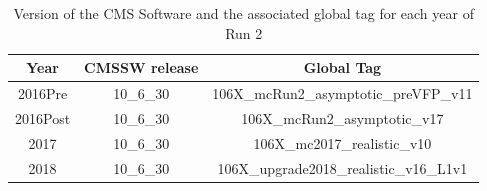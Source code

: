 \documentclass{cernatlasnote}
\begin{document}
\begin{table}
    \centering
    \begin{tabular}{| c | c | c |}
    \hline
    \rowcolor{lightgray} 
         Year &  CMSSW release & Global Tag  \\
    \hline
         2016Pre & 10\_6\_30 &   106X\_mcRun2\_asymptotic\_preVFP\_v11\\
    \hline
         2016Post & 10\_6\_30 &  106X\_mcRun2\_asymptotic\_v17  \\
    \hline
         2017 & 10\_6\_30 &  106X\_mc2017\_realistic\_v10  \\
    \hline
         2018 & 10\_6\_30 &  106X\_upgrade2018\_realistic\_v16\_L1v1 \\
    \hline
    \end{tabular}
    \caption{Version of the CMS Software and the associated global tag for each year of Run 2}
    \label{tab:MCSET}
\end{table}
\FloatBarrier
\end{document}

